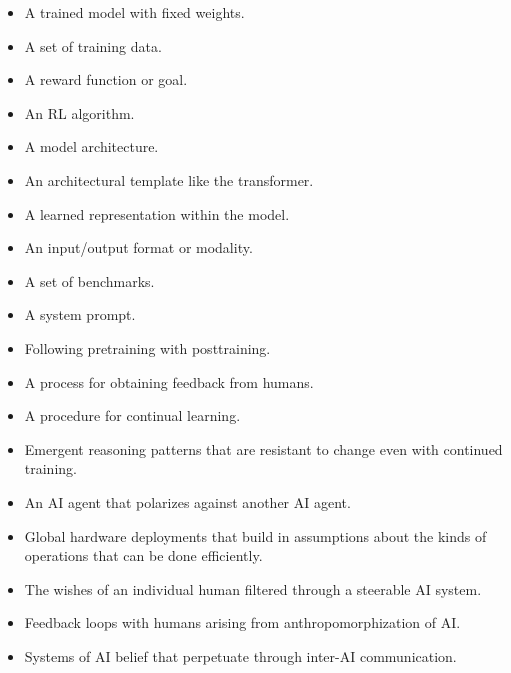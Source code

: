 \begin{itemize}
\item A trained model with fixed weights. 
\item A set of training data.
\item A reward function or goal.
\item An RL algorithm.
\item A model architecture.
\item An architectural template like the transformer.
\item A learned representation within the model.
\item An input/output format or modality.
\item A set of benchmarks. 
\item A system prompt.
\item Following pretraining with posttraining.
\item A process for obtaining feedback from humans.
\item A procedure for continual learning.
\item Emergent reasoning patterns that are resistant to change even with continued training.
\item An AI agent that polarizes against another AI agent.
\item Global hardware deployments that build in assumptions about the kinds of operations that can be done efficiently.
\item The wishes of an individual human filtered through a steerable AI system.
\item Feedback loops with humans arising from anthropomorphization of AI.
\item Systems of AI belief that perpetuate through inter-AI communication.
\end{itemize}






